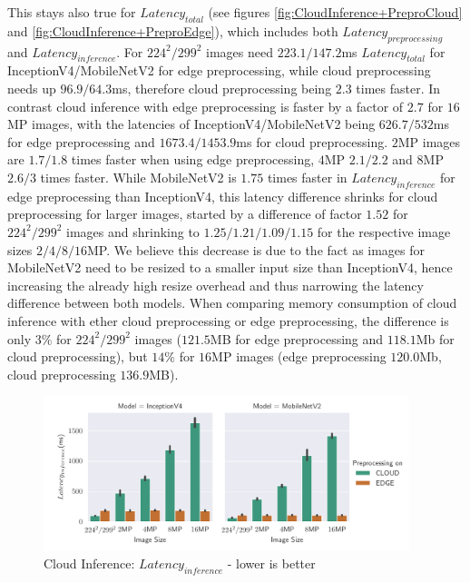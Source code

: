 This stays also true for $Latency_{total}$ (see figures \ref{fig:CloudInference+PreproCloud} and \ref{fig:CloudInference+PreproEdge}), which includes both $Latency_{preprocessing}$ and $Latency_{inference}$. 
For $224^2/299^2$ images need $223.1/147.2$ms $Latency_{total}$ for InceptionV4/MobileNetV2 for edge preprocessing, while cloud preprocessing needs up $96.9/64.3$ms, therefore cloud preprocessing being $2.3$ times faster.
In contrast cloud inference with edge preprocessing is faster by a factor of $2.7$ for $16$MP images, with the latencies of InceptionV4/MobileNetV2 being $626.7/532$ms for edge preprocessing and $1673.4/1453.9$ms for cloud preprocessing. $2$MP images are $1.7/1.8$ times faster when using edge preprocessing, $4$MP $2.1/2.2$ and $8$MP $2.6/3$ times faster.
While MobileNetV2 is $1.75$ times faster in $Latency_{inference}$ for edge preprocessing than InceptionV4, this latency difference shrinks for cloud preprocessing for larger images, started by a difference of factor $1.52$ for $224^2/299^2$ images and shrinking to $1.25/1.21/1.09/1.15$ for the respective image sizes $2/4/8/16$MP.
We believe this decrease is due to the fact as images for MobileNetV2 need to be resized to a smaller input size than InceptionV4, hence increasing the already high resize overhead and thus narrowing the latency difference between both models.
When comparing memory consumption of cloud inference with ether cloud preprocessing or edge preprocessing, the difference is only $3\%$ for  $224^2/299^2$ images ($121.5$MB for edge preprocessing and $118.1$Mb for cloud preprocessing), but $14\%$ for $16$MP images (edge preprocessing $120.0$Mb, cloud preprocessing $136.9$MB).

\begin{figure}[!htb]
\centering
\includegraphics[width=0.95\textwidth]{./Bilder/single_plots/cloud_inference_plots/Cloud_Inference_Latency.pdf}
\caption{Cloud Inference:  $Latency_{inference}$ - lower is better}
\label{fig:cloudInferenceInferenceLatency}
\end{figure}



